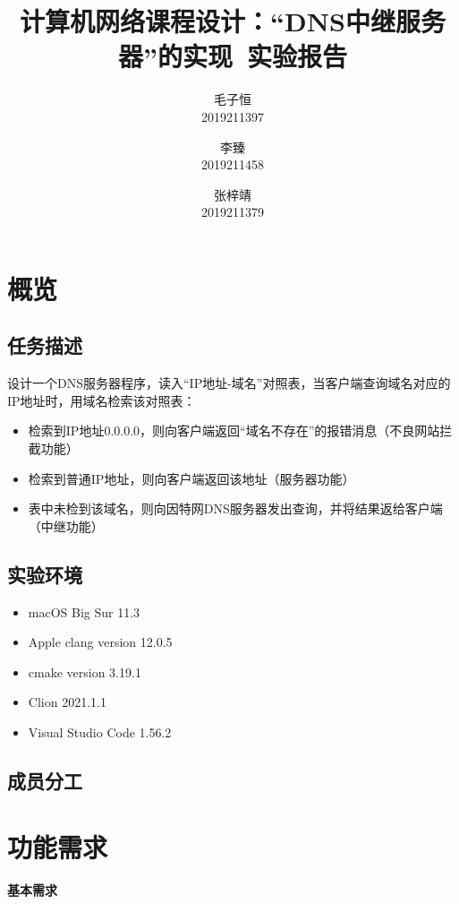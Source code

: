 \documentclass[lang=cn,11pt,a4paper,cite=authornum]{paper}
\title{计算机网络课程设计：“DNS中继服务器”的实现\ 实验报告}
\author{毛子恒 \\ 2019211397 \and 李臻 \\ 2019211458 \and 张梓靖 \\ 2019211379}
\institute{北京邮电大学\ 计算机学院}
\date{\zhtoday}
\begin{document}
\maketitle

\section{概览}

\subsection{任务描述}

\label{basic}设计一个DNS服务器程序，读入“IP地址-域名”对照表，当客户端查询域名对应的IP地址时，用域名检索该对照表：

\begin{itemize}
    \item 检索到IP地址0.0.0.0，则向客户端返回“域名不存在”的报错消息（不良网站拦截功能）
    \item 检索到普通IP地址，则向客户端返回该地址（服务器功能）
    \item 表中未检到该域名，则向因特网DNS服务器发出查询，并将结果返给客户端（中继功能）
\end{itemize}

\subsection{实验环境}

\begin{itemize}
    \item macOS Big Sur 11.3
    \item Apple clang version 12.0.5
    \item cmake version 3.19.1
    \item Clion 2021.1.1
    \item Visual Studio Code 1.56.2
\end{itemize}

\subsection{成员分工}

\section{功能需求}

\paragraph{基本需求}
\end{document}
